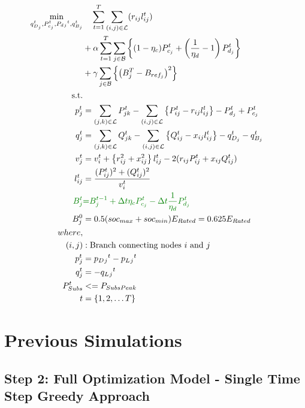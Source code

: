 \begin{gather}
	\begin{align}
		\min_{
		\substack{
		q_{D_j}^t, P_{c_j}^t, P_d{_j}^t, q_{B_j}^t}
		} 
		\vspace{-15ex} %
		& \quad
		\sum_{t = 1}^{T} \sum_{(i, j) \in \mathcal{L}} (r_{ij}l_{ij}^t) \\
		&+ \alpha \sum_{t = 1}^{T} \sum_{j \in \mathcal{B}} \left\{ (1- \eta_c)P_{c_j}^t + \left(\frac{1}{\eta_d}-1\right) P_{d_j}^t \right\} \\
		&+ \gamma \sum_{j \in \mathcal{B}} \left\{ \left(B^{T}_{j} - B_{ref_{j}}\right)^2\right\} \\
		\text{s.t.} & {}\nonumber \\
		{p_j^t} & = {\sum_{(j, k) \in \mathcal{L}} P_{jk}^t - \sum_{(i, j) \in \mathcal{L}}\left\{P_{ij}^t - r_{ij}l_{ij}^t\right\} - P_{d_j}^t + P_{c_j}^t} && \\
		{q_j^t} & = {\sum_{(j, k) \in \mathcal{L}} Q_{jk}^t - \sum_{(i, j) \in \mathcal{L}}\left\{Q_{ij}^t - x_{ij}l_{ij}^t\right\} - q_{D_j}^t - q_{B_j}^t} && \\
		{v_j^t} & = {v_{i}^t +  \left\{r_{ij}^2 + x_{ij}^2\right\}l_{ij}^t - 2(r_{ij}P_{ij}^t + x_{ij}Q_{ij}^t)} && \\
		{l_{ij}^t} & = {\frac{(P_{ij}^{t})^2 + (Q_{ij}^{t})^2}{v_i^t}} \\
		{\color{darkgreen}{ B_{j}^{t} }} &\color{darkgreen}{=} { \color{darkgreen}{ B_{j}^{t-1} + \Delta t  \eta_c P_{c_j}^t - \Delta t\frac{1}{\eta_d} P_{d_j}^t } } \\
		{ B_{j}^{0} } &= { 0.5(soc_{max}+soc_{min})E_{Rated} = 0.625E_{Rated}} \\
		{where,} & {} \\
		{(i, j)} &: {\text{Branch connecting nodes $i$ and $j$}} \\
		{p_j^t} &= {p_D{_j}^t - p_L{_j}^t} \\
		{q_j^t} &= {-q_L{_j}^t} \\
		{P_{Subs}^t} &<= {P_{SubsPeak}} \\
		{t} &= {\{1, 2, \ldots T\}}
	\end{align}
\end{gather}

\section*{Previous Simulations}
\subsection*{Step 2: Full Optimization Model - Single Time Step Greedy Approach}


